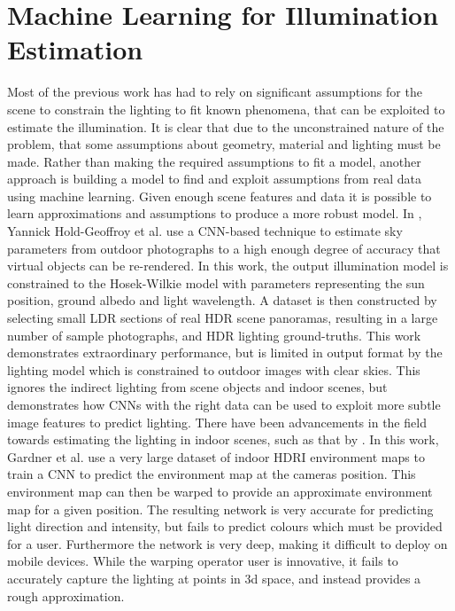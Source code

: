 \documentclass[ %
                    author={Gavin Parker},
                supervisor={Dr. Neill Campbell},
                    degree={MEng},
                     title={Deep Siamese Networks for Illumination Estimation from Stereo Images},
                  subtitle={},
                      type={research},
                      year={2018} ]{dissertation}
\begin{document}
\section{Machine Learning for Illumination Estimation}
Most of the previous work has had to rely on significant assumptions for the scene to constrain the lighting to fit known phenomena, that can be exploited to estimate the illumination. It is clear that due to the unconstrained nature of the problem, that some assumptions about geometry, material and lighting must be made. Rather than making the required assumptions to fit a model, another approach is building a model to find and exploit assumptions from real data using machine learning. Given enough scene features and data it is possible to learn approximations and assumptions to produce a more robust model. In \cite{holdgeoffroy-cvpr-17}, Yannick Hold-Geoffroy et al. use a CNN-based technique to estimate sky parameters from outdoor photographs to a high enough degree of accuracy that virtual objects can be re-rendered. In this work, the output illumination model is constrained to the Hosek-Wilkie model with parameters representing the sun position, ground albedo and light wavelength. A dataset is then constructed by selecting small LDR sections of real HDR scene panoramas, resulting in a large number of sample photographs, and HDR lighting ground-truths. This work demonstrates extraordinary performance, but is limited in output format by the lighting model which is constrained to outdoor images with clear skies. This ignores the indirect lighting from scene objects and indoor scenes, but demonstrates how CNNs with the right data can be used to exploit more subtle image features to predict lighting.
\newline
There have been advancements in the field towards estimating the lighting in indoor scenes, such as that by \cite{Gardner:2017:LPI:3130800.3130891}. In this work, Gardner et al. use a very large dataset of indoor HDRI environment maps to train a CNN to predict the environment map at the cameras position. This environment map can then be warped to provide an approximate environment map for a given position. The resulting network is very accurate for predicting light direction and intensity, but fails to predict colours which must be provided for a user. Furthermore the network is very deep, making it difficult to deploy on mobile devices. While the warping operator user is innovative, it fails to accurately capture the lighting at points in 3d space, and instead provides a rough approximation.
\end{document}
